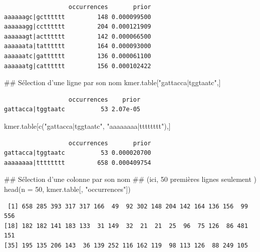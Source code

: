 \documentclass[]{article}
\newenvironment{Shaded}{\begin{snugshade}}{\end{snugshade}}
\newcommand{\KeywordTok}[1]{\textcolor[rgb]{0.94,0.87,0.69}{#1}}
\newcommand{\DataTypeTok}[1]{\textcolor[rgb]{0.87,0.87,0.75}{#1}}
\newcommand{\DecValTok}[1]{\textcolor[rgb]{0.86,0.86,0.80}{#1}}
\newcommand{\StringTok}[1]{\textcolor[rgb]{0.80,0.58,0.58}{#1}}
\newcommand{\NormalTok}[1]{\textcolor[rgb]{0.80,0.80,0.80}{#1}}
\begin{document}
\begin{verbatim}
                  occurrences       prior
aaaaaagc|gctttttt         148 0.000099500
aaaaaagg|cctttttt         204 0.000121909
aaaaaagt|actttttt         142 0.000066500
aaaaaata|tatttttt         164 0.000093000
aaaaaatc|gatttttt         136 0.000061100
aaaaaatg|catttttt         156 0.000102422
\end{verbatim}

\begin{Shaded}
\begin{Highlighting}[]
\NormalTok{## Sélection d'une ligne par son nom}
\NormalTok{kmer.table[}\StringTok{"gattacca|tggtaatc"}\NormalTok{,]}
\end{Highlighting}
\end{Shaded}

\begin{verbatim}
                  occurrences    prior
gattacca|tggtaatc          53 2.07e-05
\end{verbatim}

\begin{Shaded}
\begin{Highlighting}[]
\NormalTok{kmer.table[}\KeywordTok{c}\NormalTok{(}\StringTok{"gattacca|tggtaatc"}\NormalTok{, }\StringTok{"aaaaaaaa|tttttttt"}\NormalTok{),]}
\end{Highlighting}
\end{Shaded}

\begin{verbatim}
                  occurrences       prior
gattacca|tggtaatc          53 0.000020700
aaaaaaaa|tttttttt         658 0.000409754
\end{verbatim}

\begin{Shaded}
\begin{Highlighting}[]
\NormalTok{## Sélection d'une colonne par son nom}
\NormalTok{## (ici, 50 premières lignes seulement )}
\KeywordTok{head}\NormalTok{(}\DataTypeTok{n =} \DecValTok{50}\NormalTok{, kmer.table[, }\StringTok{"occurrences"}\NormalTok{])}
\end{Highlighting}
\end{Shaded}

\begin{verbatim}
 [1] 658 285 393 317 317 166  49  92 302 148 204 142 164 136 156  99 556
[18] 182 182 141 183 133  31 149  32  21  21  25  96  75 126  86 481 151
[35] 195 135 206 143  36 139 252 116 162 119  98 113 126  88 249 105
\end{verbatim}
\end{document}
